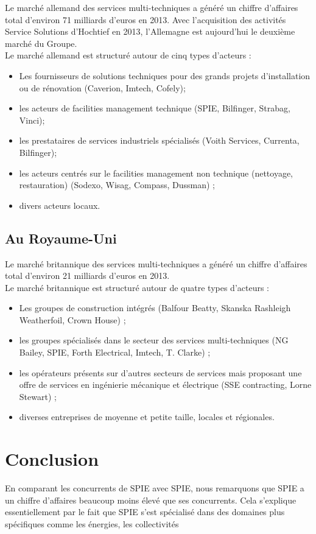 Le marché allemand des services multi-techniques a généré un chiffre d’affaires total d’environ 71 milliards d’euros en 2013. Avec l’acquisition des activités Service Solutions d’Hochtief en 2013, l’Allemagne est aujourd’hui le deuxième marché du Groupe.  \\

\noindent Le marché allemand est structuré autour de cinq types d’acteurs : 
\begin{itemize}
    \item Les fournisseurs de solutions techniques pour des grands projets d’installation ou de rénovation (Caverion, Imtech, Cofely); 
    \item les acteurs de facilities management technique (SPIE, Bilfinger, Strabag, Vinci);
    \item les prestataires de services industriels spécialisés (Voith Services, Currenta, Bilfinger);
    \item les acteurs centrés sur le facilities management non technique (nettoyage, restauration) (Sodexo, Wisag, Compass, Dussman) ;
    \item divers acteurs locaux. 
\end{itemize}

\subsection{Au Royaume-Uni}

Le marché britannique des services multi-techniques a généré un chiffre d’affaires total d’environ 21 milliards d’euros en 2013. \\

\noindent Le marché britannique est structuré autour de quatre types d’acteurs : 
\begin{itemize}
    \item Les groupes de construction intégrés (Balfour Beatty, Skanska Rashleigh Weatherfoil, Crown House) ;
    \item les groupes spécialisés dans le secteur des services multi-techniques (NG Bailey, SPIE, Forth Electrical, Imtech, T. Clarke) ;
    \item les opérateurs présents sur d’autres secteurs de services mais proposant une offre de services en ingénierie mécanique et électrique (SSE contracting, Lorne Stewart) ;
    \item diverses entreprises de moyenne et petite taille, locales et régionales.
\end{itemize}

\section{Conclusion}

En comparant les concurrents de SPIE avec SPIE, nous remarquons que SPIE a un chiffre
d’affaires beaucoup moins élevé que ses concurrents. Cela s’explique essentiellement par le fait que SPIE s’est spécialisé dans des domaines plus spécifiques comme les énergies, les collectivités
